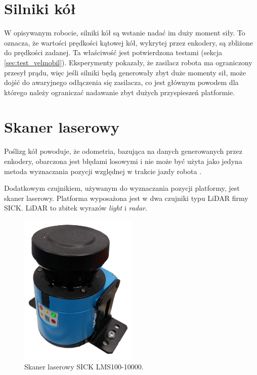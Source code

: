 \section{Silniki kół}
	\label{sec:motors}
	W opisywanym robocie, silniki kół są wstanie nadać im duży moment siły.
	To oznacza, że wartości prędkości kątowej kół, wykrytej przez enkodery, są zbliżone do prędkości zadanej.
	Ta właściwość jest potwierdzona testami (sekcja \ref{sec:test_velmobil}).
	Eksperymenty pokazały, że zasilacz robota ma ograniczony przesył prądu, więc jeśli silniki będą generowały zbyt duże momenty sił, może dojść do awaryjnego odłączenia się zasilacza, 
	co jest głównym powodem dla którego należy ograniczać nadawanie zbyt dużych przyspieszeń platformie.
	
\section{Skaner laserowy}
	\label{sec:lidar}
	Poślizg kół powoduje, że odometria, bazująca na danych generowanych przez enkodery, obarczona jest błędami losowymi i nie może być 
	użyta jako jedyna metoda wyznaczania pozycji względnej w trakcie jazdy robota \cite{heavy}.
	
	Dodatkowym czujnikiem, używanym do wyznaczania pozycji platformy, jest skaner laserowy.
	Platforma wyposażona jest w dwa czujniki typu LiDAR firmy SICK.
	LiDAR to zbitek wyrazów \emph{light} i \emph{radar}.

	\begin{figure}[h]
	\centering
	\includegraphics[width=0.5\textwidth]{graphics/sensor.png}
	\caption{Skaner laserowy SICK LMS100-10000.}
	\label{fig:sensor}
	\end{figure} 

